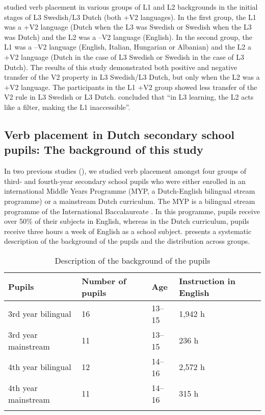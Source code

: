 \documentclass[output=paper,modfonts,nonflat, newtxmath]{langsci/langscibook}
\begin{document}
\citet{BardelFalk2007} studied verb placement in various groups of L1 and L2 backgrounds in the initial stages of L3 Swedish/L3 Dutch (both +V2 languages). In the first group, the L1 was a +V2 language (Dutch when the L3 was Swedish or Swedish when the L3 was Dutch) and the L2 was a –V2 language (English). In the second group, the L1 was a –V2 language (English, Italian, Hungarian or Albanian) and the L2 a +V2 language (Dutch in the case of L3 Swedish or Swedish in the case of L3 Dutch). The results of this study demonstrated both positive and negative transfer of the V2 property in L3 Swedish/L3 Dutch, but only when the L2 was a +V2 language. The participants in the L1 +V2 group showed less transfer of the V2 rule in L3 Swedish or L3 Dutch. \citet[480]{BardelFalk2007} concluded that “in L3 learning, the L2 acts like a filter, making the L1 inaccessible”.

\subsection{{Verb} {placement} {in} {Dutch} {secondary} {school} {pupils:} {The} {background} {of} {this} {study}}%
\label{sec:stadt:2.3}

In two previous studies (\citealt{StadtEtAl2016, StadtEtAl2018Exposure}), we studied verb placement amongst four groups of third- and fourth-year secondary school pupils who were either enrolled in an international Middle Years Programme (MYP, a Dutch-English bilingual stream programme) or a mainstream Dutch curriculum. The MYP is a bilingual stream programme of the International Baccalaureate \citep{IBO2019}. In this programme, pupils receive over 50\% of their subjects in English, whereas in the Dutch curriculum, pupils receive three hours a week of English as a school subject.  presents a systematic description of the background of the pupils and the distribution across groups.

\begin{table}
\caption{ Description of the background of the pupils}
\label{tab:stadt:1}

\begin{tabularx}{.85\textwidth}{p{3.8cm} Y Y Y}
\lsptoprule
Pupils &  Number of \newline pupils & Age & Instruction \newline in English\\
	\midrule
3rd year bilingual &  16 & 13--15 & 1,942 h\\
3rd year mainstream &  11 & 13--15 & 236 h\\
4th year bilingual &   12 & 14--16 & 2,572 h\\
4th year mainstream &  11 & 14--16 & 315 h\\
\lspbottomrule
\end{tabularx}
\end{table}
\end{document}
